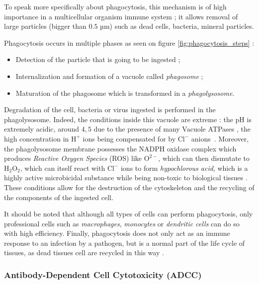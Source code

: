 To speak more specifically about phagocytosis, this mechanism is of high importance
in a multicellular organism immune system ; it allows removal of large particles
(bigger than $0.5$ µm) such as dead cells, bacteria, mineral particles.

\newpage

Phagocytosis occurs in multiple phases \cite{uribe-querol_phagocytosis_2020}
as seen on figure \ref{fig:phagocytosis_steps} : 
\begin{itemize}
    \item Detection of the particle that is going to be ingested ;
    \item Internalization and formation of a vacuole called \emph{phagosome} ;
    \item Maturation of the phagosome which is transformed in a \emph{phagolysosome}.
\end{itemize}

Degradation of the cell, bacteria or virus ingested is performed in the phagolysosome.
Indeed, the conditions inside this vacuole are extreme : the pH is extremely acidic,
around $4,5$ due to the presence of many Vacuole ATPases \cite{uribe-querol_phagocytosis_2020},
the high concentration in $\text{H}^+$ ions being compensated for
by $\text{Cl}^-$ anions~\cite{gordon_phagocytosis_2016}. 
Moreover, the phagolysosome membrane possesses the NADPH oxidase complex 
which produces \emph{Reactive Oxygen Species} (ROS) like $\text{O}^{2-}$, which can then
dismutate to $\text{H}_2\text{O}_2$, which can itself react with $\text{Cl}^-$ ions
to form \emph{hypochlorous acid}, which is a highly active microbicidal substance while
being non-toxic to biological tissues \cite{eryilmaz_antimicrobial_2013}.
These conditions allow for the destruction of the cytoskeleton and the 
recycling of the components of the ingested cell.


It should be noted that although all types of cells can perform phagocytosis,
only professional cells such as \emph{macrophages}, \emph{monocytes} or \emph{dendritic cells} can
do so with high efficiency. Finally, phagocytosis does not only act as an
immune response to an infection by a pathogen, but is a normal part of the
life cycle of tissues, as dead tissues cell are recycled 
in this way \cite{arandjelovic_phagocytosis_2015}.

\subsubsection{Antibody-Dependent Cell Cytotoxicity (ADCC)}

